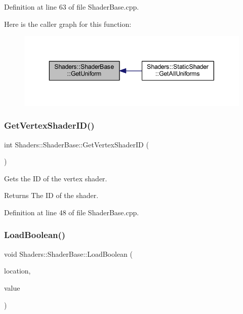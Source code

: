 Definition at line 63 of file Shader\+Base.\+cpp.

Here is the caller graph for this function\+:
\nopagebreak
\begin{figure}[H]
\begin{center}
\leavevmode
\includegraphics[width=343pt]{class_shaders_1_1_shader_base_ae3fa1c430786dccf85b86e0337fa7f02_icgraph}
\end{center}
\end{figure}
\mbox{\label{class_shaders_1_1_shader_base_afb5d93c464cf2f726557bd4ff43d90ef}} 
\subsubsection{\texorpdfstring{Get\+Vertex\+Shader\+I\+D()}{GetVertexShaderID()}}
{\footnotesize\ttfamily int Shaders\+::\+Shader\+Base\+::\+Get\+Vertex\+Shader\+ID (\begin{DoxyParamCaption}{ }\end{DoxyParamCaption})}

Gets the ID of the vertex shader. \begin{DoxyReturn}{Returns}
The ID of the shader. 
\end{DoxyReturn}


Definition at line 48 of file Shader\+Base.\+cpp.

\mbox{\label{class_shaders_1_1_shader_base_a0f3ec02c991021e8da69c1ab885624b9}} 
\subsubsection{\texorpdfstring{Load\+Boolean()}{LoadBoolean()}}
{\footnotesize\ttfamily void Shaders\+::\+Shader\+Base\+::\+Load\+Boolean (\begin{DoxyParamCaption}\item[{G\+Luint}]{location,  }\item[{bool}]{value }\end{DoxyParamCaption})\hspace{0.3cm}{\ttfamily [protected]}}

